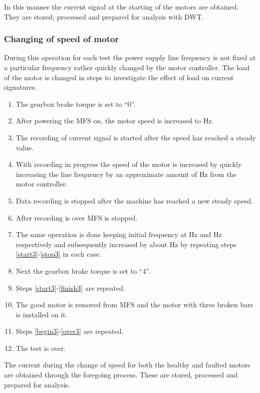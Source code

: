 \documentclass[a4paper,11pt]{report}
\begin{document}
In this manner the current signal at the starting of the motors are obtained. They are stored, processed and prepared for analysis with DWT.

\subsubsection{Changing of speed of motor}
During this operation for each test the power supply line frequency is not fixed at a particular frequency rather quickly changed by the motor controller. The load of the motor is changed in steps to investigate the effect of load on current signatures.

\begin{enumerate}
\item The gearbox brake torque is set to ``0''. \label{begin3}
\item After powering the MFS on, the motor speed is increased to \unit[30]{Hz}. \label{start3}
\item The recording of current signal is started after the speed has reached a steady value.
\item With recording in progress the speed of the motor is increased by quickly increasing the line frequency by an approximate amount of \unit[10]{Hz} from the motor controller.
\item Data recording is stopped after the machine has reached a new steady speed.
\item After recording is over MFS is stopped. \label{stop3}
\item The same operation is done keeping initial frequency at \unit[40]{Hz} and \unit[50]{Hz} respectively and subsequently increased by about \unit[10]{Hz} by repeating steps \ref{start3}-\ref{stop3} in each case. \label{finish3}
\item Next the gearbox brake torque is set to ``4''.
\item Steps \ref{start3}-\ref{finish3} are repeated. \label{over3}
\item The good motor is removed from MFS and the motor with three broken bars is installed on it.
\item Steps \ref{begin3}-\ref{over3} are repeated.
\item The test is over.
\end{enumerate}

The current during the change of speed for both the healthy and faulted motors are obtained through the foregoing process. These are stored, processed and prepared for analysis.
\end{document}
